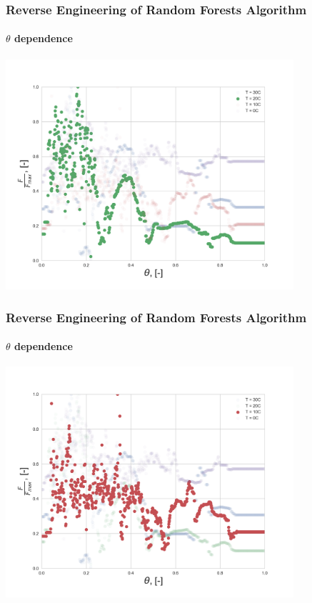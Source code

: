 \documentclass{beamer}
\begin{document}
\begin{frame}
\frametitle{Reverse Engineering of Random Forests Algorithm}
\framesubtitle{$\theta$ dependence}

\centering
\includegraphics[width=0.8\textwidth]{Theta_dependence_20.png}

\end{frame}

\begin{frame}
\frametitle{Reverse Engineering of Random Forests Algorithm}
\framesubtitle{$\theta$ dependence}

\centering
\includegraphics[width=0.8\textwidth]{Theta_dependence_10.png}

\end{frame}
\end{document}
